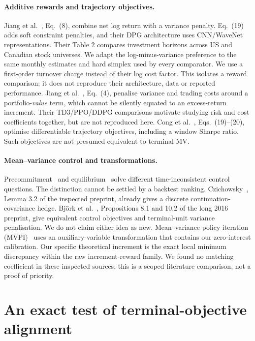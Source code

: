 \documentclass[sigconf,anonymous,review,pbalance]{acmart}
\begin{document}
\paragraph{Additive rewards and trajectory objectives.}
Jiang et al.\ \cite{jiang2025}, Eq.\ (8), combine net log return with a variance penalty. Eq.\ (19) adds soft constraint penalties, and their DPG architecture uses CNN/WaveNet representations. Their Table 2 compares investment horizons across US and Canadian stock universes. We adapt the log-minus-variance preference to the same monthly estimates and hard simplex used by every comparator. We use a first-order turnover charge instead of their log cost factor. This isolates a reward comparison; it does not reproduce their architecture, data or reported performance. Jiang et al.\ \cite{jiang2024}, Eq.\ (4), penalise variance and trading costs around a portfolio-\emph{value} term, which cannot be silently equated to an excess-return increment. Their TD3/PPO/DDPG comparisons motivate studying risk and cost coefficients together, but are not reproduced here. Cong et al.\ \cite{cong2026}, Eqs.\ (19)--(20), optimise differentiable trajectory objectives, including a window Sharpe ratio. Such objectives are not presumed equivalent to terminal MV.

\paragraph{Mean--variance control and transformations.}
Precommitment\ \cite{ling2000} and equilibrium\ \cite{basak2010,dai2023} solve different time-inconsistent control questions. The distinction cannot be settled by a backtest ranking. Czichowsky\ \cite{czichowsky2013}, Lemma 3.2 of the inspected preprint, already gives a discrete continuation-covariance hedge. Bj\"ork et al.\ \cite{bkm2016}, Propositions 8.1 and 10.2 of the long 2016 preprint, give equivalent control objectives and terminal-unit variance penalisation. We do not claim either idea as new. Mean--variance policy iteration (MVPI)\ \cite{zhang2021} uses an auxiliary-variable transformation that contains our zero-interest calibration. Our specific theoretical increment is the exact local minimum discrepancy within the raw increment-reward family. We found no matching coefficient in these inspected sources; this is a scoped literature comparison, not a proof of priority.

\section{An exact test of terminal-objective alignment}
\end{document}
